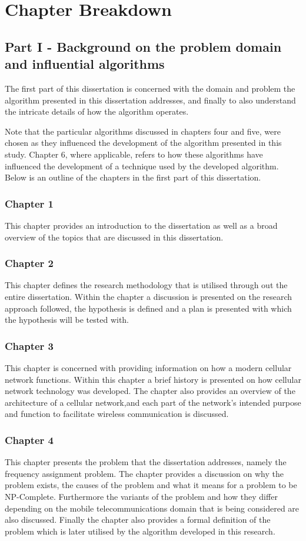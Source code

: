 \section {Chapter Breakdown}
\subsection{Part I - Background on the problem domain and influential algorithms}
The first part of this dissertation is concerned with the domain and problem the algorithm presented in this dissertation addresses, and finally to also understand the intricate details of how the algorithm operates.

Note that the particular algorithms discussed in chapters four and five, were chosen as they influenced the development of the algorithm presented in this study. Chapter 6, where applicable, refers to how these algorithms have influenced the development of a technique used by the developed algorithm.
Below is an outline of the chapters in the first part of this dissertation.
\subsubsection{Chapter 1}
This chapter provides an introduction to the dissertation as well as a broad overview of the topics that are discussed in this dissertation.
\subsubsection{Chapter 2}
This chapter defines the research methodology that is utilised through out the entire dissertation. Within the chapter a discussion is presented on the research approach followed, the hypothesis is defined and a plan is presented with which the hypothesis will be tested with.
\subsubsection{Chapter 3}
This chapter is concerned with providing information on how a modern cellular network functions. Within this chapter a brief history is presented on how cellular network technology was developed. The chapter also provides an overview of the architecture of a cellular network,and each part of the network's intended purpose and function to facilitate wireless communication is discussed.
\subsubsection{Chapter 4}
This chapter presents the problem that the dissertation addresses, namely the frequency assignment problem. The chapter provides a discussion on why the problem exists, the causes of the problem and what it means for a problem to be NP-Complete. Furthermore the variants of the problem and how they differ depending on the mobile telecommunications domain that is being considered are also discussed. Finally the chapter also provides a formal definition of the problem which is later utilised by the algorithm developed in this research.
